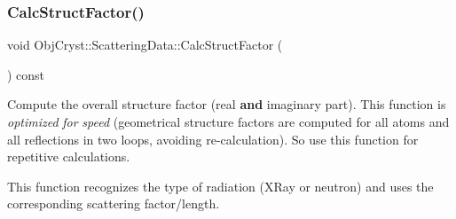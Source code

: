 \subsubsection{\texorpdfstring{CalcStructFactor()}{CalcStructFactor()}}
{\footnotesize\ttfamily void Obj\+Cryst\+::\+Scattering\+Data\+::\+Calc\+Struct\+Factor (\begin{DoxyParamCaption}{ }\end{DoxyParamCaption}) const\hspace{0.3cm}{\ttfamily [protected]}}



Compute the overall structure factor (real {\bfseries{and}} imaginary part). This function is {\itshape optimized} {\itshape for} {\itshape speed} (geometrical structure factors are computed for all atoms and all reflections in two loops, avoiding re-\/calculation). So use this function for repetitive calculations. 

This function recognizes the type of radiation (X\+Ray or neutron) and uses the corresponding scattering factor/length.

